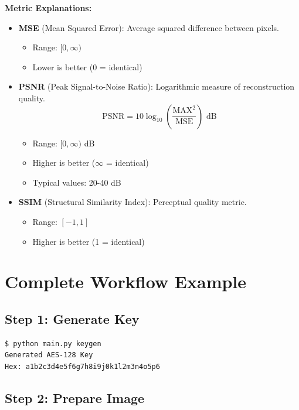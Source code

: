 \documentclass[12pt,a4paper]{report}
\begin{document}
\textbf{Metric Explanations:}
\begin{itemize}
    \item \textbf{MSE} (Mean Squared Error): Average squared difference between pixels.
    \begin{itemize}
        \item Range: $[0, \infty)$
        \item Lower is better (0 = identical)
    \end{itemize}
    
    \item \textbf{PSNR} (Peak Signal-to-Noise Ratio): Logarithmic measure of reconstruction quality.
    \begin{equation}
        \text{PSNR} = 10 \log_{10}\left(\frac{\text{MAX}^2}{\text{MSE}}\right) \text{ dB}
    \end{equation}
    \begin{itemize}
        \item Range: $[0, \infty)$ dB
        \item Higher is better ($\infty$ = identical)
        \item Typical values: 20-40 dB
    \end{itemize}
    
    \item \textbf{SSIM} (Structural Similarity Index): Perceptual quality metric.
    \begin{itemize}
        \item Range: $[-1, 1]$
        \item Higher is better (1 = identical)
    \end{itemize}
\end{itemize}

\section{Complete Workflow Example}

\subsection{Step 1: Generate Key}

\begin{lstlisting}[language=bash]
$ python main.py keygen
Generated AES-128 Key
Hex: a1b2c3d4e5f6g7h8i9j0k1l2m3n4o5p6
\end{lstlisting}

\subsection{Step 2: Prepare Image}
\end{document}
